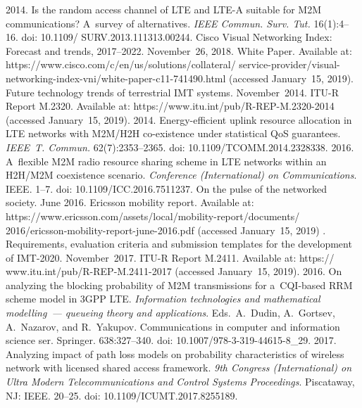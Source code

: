   \begin{multicols}{2}

\renewcommand{\bibname}{\protect\rmfamily References}

{\small\frenchspacing
 {%
 \begin{thebibliography}{99}
 2014. Is the random access channel 
of LTE 
and LTE-A suitable for M2M communications? A~survey of alternatives. 
\textit{IEEE Commun. 
Surv. Tut.} 16(1):4--16. doi: 10.1109/ SURV.2013.111313.00244.
Cisco Visual Networking Index: Forecast and trends, 2017--2022.  November~26, 
2018. White Paper. Available at: 
{\sf https://www.cisco.com/c/en/us/solutions/collateral/\linebreak
service-provider/visual-networking-index-vni/white-paper-c11-741490.html}
 (accessed January~15, 2019).
  Future technology trends of terrestrial IMT systems. November~2014.
  ITU-R Report M.2320.
Available at: {\sf 
https://www.itu.int/pub/R-REP-M.2320-2014} (accessed January~15, 2019).
2014. Energy-efficient 
uplink resource allocation in LTE networks with M2M/H2H 
co-existence under statistical QoS 
guarantees. \textit{IEEE~T. Commun.} 62(7):2353--2365. doi: 
10.1109/TCOMM.2014.2328338.
 2016. 
A~flexible M2M radio resource 
sharing scheme in LTE networks within an H2H/M2M coexistence scenario. 
\textit{Conference (International) on Communications}. IEEE. 1--7. 
doi: 10.1109/ICC.2016.7511237.
On the pulse of the networked society. 
June 2016. Ericsson mobility report. Available at: 
{\sf https://www.\linebreak ericsson.com/assets/local/mobility-report/documents/ 2016/ericsson-mobility-report-june-2016.pdf}
 (accessed January~15, 2019) . 
 Requirements, evaluation criteria and submission 
templates for the development of IMT-2020. 
 November~2017.
 ITU-R Report M.2411. Available at: {\sf 
https:// www.itu.int/pub/R-REP-M.2411-2017} (accessed January~15, 2019). 
 2016. 
On analyzing the blocking 
probability of M2M transmissions for a~CQI-based RRM scheme model in 3GPP LTE. 
\textit{Information 
technologies and mathematical modelling~--- queueing theory and applications}.
Eds.\ A.~Dudin, A.~Gortsev, A.~Nazarov, and R.~Yakupov.
Communications in computer and information science ser.
Springer. 638:327--340. doi: 10.1007/978-3-319-44615-8\_29.
 2017. 
Analyzing impact of path loss 
models on probability characteristics of wireless network with licensed shared access 
framework. \textit{9th Congress (International) on Ultra Modern Telecommunications and 
Control Systems Proceedings}.  
Piscataway, NJ: IEEE. 20--25. doi: 10.1109/ICUMT.2017.8255189.


\end{thebibliography}}}
\end{multicols}
